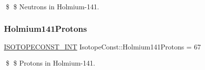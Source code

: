 \$ \$ Neutrons in Holmium-\/141. \mbox{\label{group___isotope_const-_holmium-_ho141_ga5ae8416198d75a8e00d08a5d729cdd38}} 
\subsubsection{\texorpdfstring{Holmium141\+Protons}{Holmium141Protons}}
{\footnotesize\ttfamily \mbox{\hyperlink{group___isotope_const-_macros_ga5f18360b3e99483a35c32d789e62621c}{I\+S\+O\+T\+O\+P\+E\+C\+O\+N\+S\+T\+\_\+\+I\+NT}} Isotope\+Const\+::\+Holmium141\+Protons = 67}

\$ \$ Protons in Holmium-\/141. 